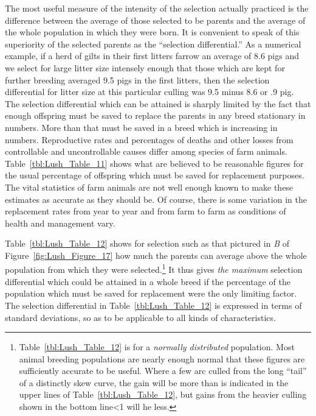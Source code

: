 The most useful measure of the intensity of the selection actually
practiced is the difference between the average of those selected to be
parents and the average of the whole population in which they were
born. It is convenient to speak of this superiority of the selected parents
as the ``selection differential.'' As a numerical example, if a herd of gilts
in their first litters farrow an average of 8.6 pigs and we select for large
litter size intensely enough that those which are kept for further breeding
averaged 9.5 pigs in the first litters, then the selection differential
for litter size at this particular culling was 9.5 minus 8.6 or .9 pig. The
selection differential which can be attained is sharply limited by the fact
that enough offspring must be saved to replace the parents in any breed
stationary in numbers. More than that must be saved in a breed which
is increasing in numbers. Reproductive rates and percentages of deaths
and other losses from controllable and uncontrollable causes differ
among species of farm animals. Table~\ref{tbl:Lush_Table_11} shows what are believed
to be reasonable figures for the usual percentage of offspring which must be
saved for replacement purposes. The vital statistics of farm animals are
not well enough known to make these estimates as accurate as they
should be. Of course, there is some variation in the replacement rates
from year to year and from farm to farm as conditions of health and
management vary.

Table~\ref{tbl:Lush_Table_12} shows for selection such as that pictured in
\textit{B} of Figure~\ref{fig:Lush_Figure_17} how much the parents can
average above the whole population from which they were selected.\footnote{Table~\ref{tbl:Lush_Table_12}
is for a \textit{normally distributed} population. Most animal breeding
populations are nearly enough normal that these figures are sufficiently accurate to be
useful. Where a few arc culled from the long ``tail'' of a distinctly skew curve, the
gain will be more than is indicated in the upper lines of Table~\ref{tbl:Lush_Table_12},
but gains from the heavier culling shown in the bottom line<1 will he less.}
It thus gives \textit{the maximum} selection differential which could be attained in a
whole breed if the percentage of the population which must be saved for replacement
were the only limiting factor. The selection differential in Table~\ref{tbl:Lush_Table_12}
is expressed in terms of standard deviations, so as to be applicable to all kinds of
characteristics.

